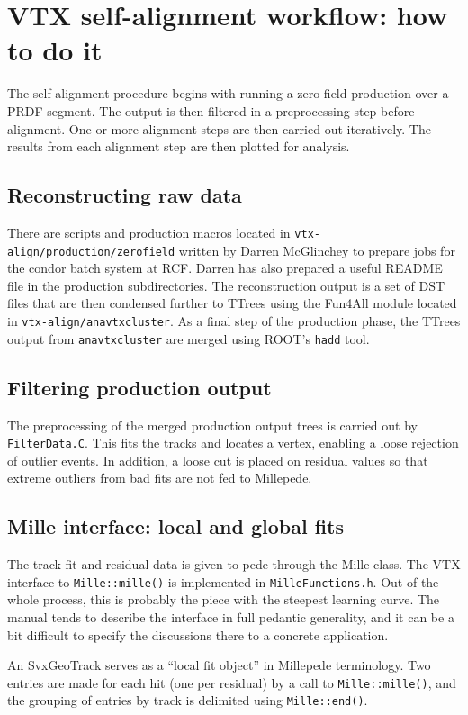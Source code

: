 \documentclass[12pt]{article}
\begin{document}
\section{VTX self-alignment workflow: how to do it}
The self-alignment procedure begins with running a zero-field production over a PRDF segment. The output is then filtered in a preprocessing step before alignment. One or more alignment steps are then carried out iteratively. The results from each alignment step are then plotted for analysis.

\subsection{Reconstructing raw data}
There are scripts and production macros located in \texttt{vtx-align/production/zerofield} written by Darren McGlinchey to prepare jobs for the condor batch system at RCF. Darren has also prepared a useful README file in the production subdirectories. The reconstruction output is a set of DST files that are then condensed further to TTrees using the Fun4All module located in \texttt{vtx-align/anavtxcluster}. As a final step of the production phase, the TTrees output from \texttt{anavtxcluster} are merged using ROOT's \texttt{hadd} tool.

\subsection{Filtering production output}
The preprocessing of the merged production output trees is carried out by \texttt{FilterData.C}. This fits the tracks and locates a vertex, enabling a loose rejection of outlier events. In addition, a loose cut is placed on residual values so that extreme outliers from bad fits are not fed to Millepede.

\subsection{Mille interface: local and global fits}
The track fit and residual data is given to pede through the Mille class. The VTX interface to \texttt{Mille::mille()} is implemented in \texttt{MilleFunctions.h}. Out of the whole process, this is probably the piece with the steepest learning curve. The manual tends to describe the interface in full pedantic generality, and it can be a bit difficult to specify the discussions there to a concrete application.

An SvxGeoTrack serves as a ``local fit object'' in Millepede terminology. Two entries are made for each hit (one per residual) by a call to \texttt{Mille::mille()}, and the grouping of entries by track is delimited using \texttt{Mille::end()}.
\end{document}
